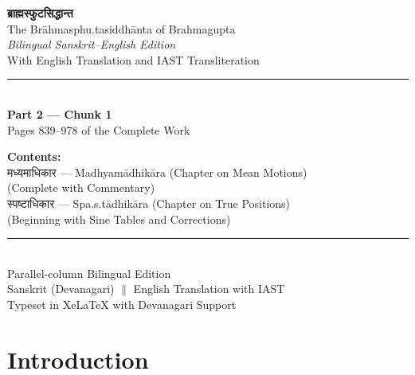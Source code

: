 \documentclass[11pt,a4paper]{book}
\newcommand{\dev}[1]{{\devanagarifont #1}}
\begin{document}
\begin{titlepage}
\begin{center}
\vspace*{2cm}

{\Huge\bfseries\color{titlecolor} \dev{ब्राह्मस्फुटसिद्धान्त}}\\[1cm]
{\LARGE\color{sectioncolor} The Brāhmasphu.tasiddhānta of Brahmagupta}\\[0.8cm]
{\large\textit{Bilingual Sanskrit--English Edition}}\\[0.3cm]
{\normalsize With English Translation and IAST Transliteration}\\[2cm]

\rule{0.6\textwidth}{1pt}\\[1cm]

{\Large\bfseries Part 2 --- Chunk 1}\\[0.5cm]
{\large Pages 839--978 of the Complete Work}\\[1cm]

\vspace{0.5cm}

{\large\color{sectioncolor}
\textbf{Contents:}\\[0.3cm]
\dev{मध्यमाधिकार} --- Madhyamādhikāra (Chapter on Mean Motions)\\
(Complete with Commentary)\\[0.3cm]
\dev{स्पष्टाधिकार} --- Spa.s.tādhikāra (Chapter on True Positions)\\
(Beginning with Sine Tables and Corrections)\\[0.5cm]
}

\vfill

\rule{0.4\textwidth}{0.5pt}\\[0.5cm]
{\large Parallel-column Bilingual Edition}\\[0.3cm]
{\small Sanskrit (Devanagari) $\|$ English Translation with IAST}\\[0.3cm]
{\footnotesize Typeset in XeLaTeX with Devanagari Support}

\end{center}
\end{titlepage}

\clearpage

\chapter*{Introduction}
\end{document}
